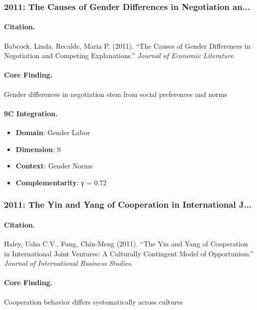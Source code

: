 \subsubsection{2011: The Causes of Gender Differences in Negotiation an...}

\paragraph{Citation.}
Babcock, Linda, Recalde, Maria P. (2011). ``The Causes of Gender Differences in Negotiation and Competing Explanations.''
\textit{Journal of Economic Literature}.

\paragraph{Core Finding.}
Gender differences in negotiation stem from social preferences and norms

\paragraph{9C Integration.}
\begin{itemize}[nosep]
  \item \textbf{Domain}: Gender Labor
  \item \textbf{Dimension}: S
  \item \textbf{Context}: Gender Norms
  \item \textbf{Complementarity}: γ = 0.72
\end{itemize}

\subsubsection{2011: The Yin and Yang of Cooperation in International J...}

\paragraph{Citation.}
Haley, Usha C.V., Fung, Chin-Meng (2011). ``The Yin and Yang of Cooperation in International Joint Ventures: A Culturally Contingent Model of Opportunism.''
\textit{Journal of International Business Studies}.

\paragraph{Core Finding.}
Cooperation behavior differs systematically across cultures

